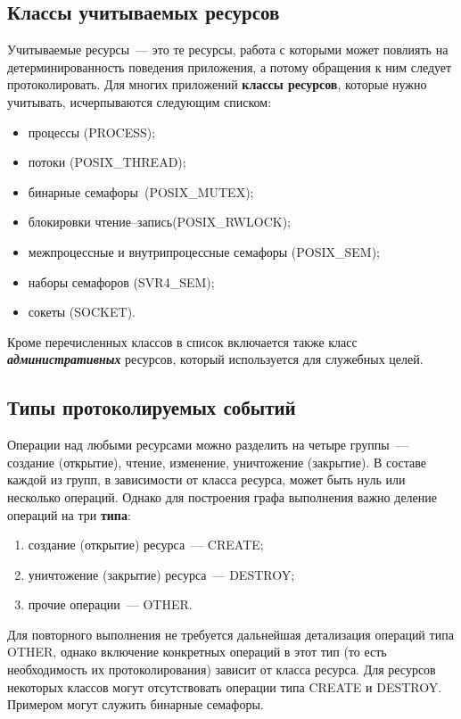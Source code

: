 \begin{multicols}{2}
\subsection*{Классы учитываемых ресурсов}

Учитываемые ресурсы~--- это те ресурсы, рабо\-та с которыми может повлиять
на де\-тер\-ми\-нирован\-ность поведения приложения, а потому обращения к ним
следует протоколировать. Для многих приложений \textbf{классы ресурсов},
которые нужно учитывать, исчерпываются сле\-ду\-ющим списком:
\begin{itemize}
\item процессы (PROCESS);
\item потоки (POSIX\_THREAD);
\item бинарные семафоры~(POSIX\_MUTEX);
\item блокировки чтение--запись\newline (POSIX\_RWLOCK);
\item межпроцессные и внутрипроцессные семафоры (POSIX\_SEM);
\item наборы семафоров (SVR4\_SEM);
\item сокеты (SOCKET).
\end{itemize}

Кроме перечисленных классов в список включается также класс
{\bfseries\textit{административных}} ресурсов, который используется для служебных
целей.

\subsection*{Типы протоколируемых событий}

Операции над любыми ресурсами можно разделить на четыре группы~---
создание (открытие), чтение, изменение, уничтожение (закрытие). В составе
каждой из групп, в зависимости от класса ресурса, может быть нуль или
несколько операций. Однако для по\-стро\-ения графа выполнения важно деление
операций на три \textbf{типа}:
\begin{enumerate}[(1)]
\item создание (открытие) ресурса~--- CREATE;
\item уничтожение (закрытие) ресурса~--- DESTROY;
\item прочие операции~--- OTHER.
\end{enumerate}

Для повторного выполнения не требуется дальнейшая детализация операций
типа \mbox{OTHER}, однако включение конкретных операций в этот тип (то есть
необходимость их протоколирования) зависит от класса ресурса. Для ресурсов
некоторых классов могут отсутствовать операции типа CREATE и DESTROY.
Примером могут служить бинарные семафоры.


\end{multicols}
